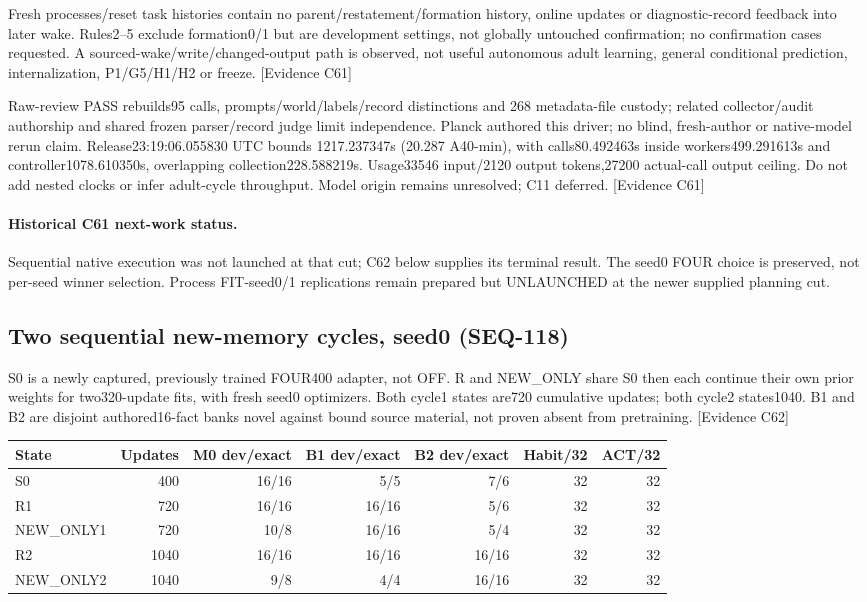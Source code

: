 \documentclass[11pt]{article}
\newcommand{\ev}[1]{\textsf{[Evidence #1]}}
\begin{document}
Fresh processes/reset task histories contain no parent/restatement/formation
history, online updates or diagnostic-record feedback into later wake. Rules2--5
exclude formation0/1 but are development settings, not globally untouched
confirmation; no confirmation cases requested. A sourced-wake/write/changed-output
path is observed, not useful autonomous adult learning, general conditional
prediction, internalization, P1/G5/H1/H2 or freeze. \ev{C61}

Raw-review PASS rebuilds95 calls, prompts/world/labels/record distinctions and
268 metadata-file custody; related collector/audit authorship and shared frozen
parser/record judge limit independence. Planck authored this driver; no blind,
fresh-author or native-model rerun claim. Release23:19:06.055830 UTC bounds
1217.237347s (20.287 A40-min), with calls80.492463s inside workers499.291613s and
controller1078.610350s, overlapping collection228.588219s. Usage33546 input/2120
output tokens,27200 actual-call output ceiling. Do not add nested clocks or infer
adult-cycle throughput. Model origin remains unresolved; C11 deferred. \ev{C61}

\paragraph{Historical C61 next-work status.} Sequential native execution was not
launched at that cut; C62 below supplies its terminal result. The seed0 FOUR
choice is preserved, not per-seed winner selection. Process FIT-seed0/1
replications remain prepared but UNLAUNCHED at the newer supplied planning cut.

\subsection{Two sequential new-memory cycles, seed0 (SEQ-118)}
S0 is a newly captured, previously trained FOUR400 adapter, not OFF. R and
NEW\_ONLY share S0 then each continue their own prior weights for two320-update
fits, with fresh seed0 optimizers. Both cycle1 states are720 cumulative updates;
both cycle2 states1040. B1 and B2 are disjoint authored16-fact banks novel against
bound source material, not proven absent from pretraining. \ev{C62}

\begin{center}
\begin{tabular}{lrrrrrr}
\toprule
State & Updates & M0 dev/exact & B1 dev/exact & B2 dev/exact & Habit/32 & ACT/32 \\
\midrule
S0 & 400 & 16/16 & 5/5 & 7/6 & 32 & 32 \\
R1 & 720 & 16/16 & 16/16 & 5/6 & 32 & 32 \\
NEW\_ONLY1 & 720 & 10/8 & 16/16 & 5/4 & 32 & 32 \\
R2 & 1040 & 16/16 & 16/16 & 16/16 & 32 & 32 \\
NEW\_ONLY2 & 1040 & 9/8 & 4/4 & 16/16 & 32 & 32 \\
\bottomrule
\end{tabular}
\end{center}
\end{document}
